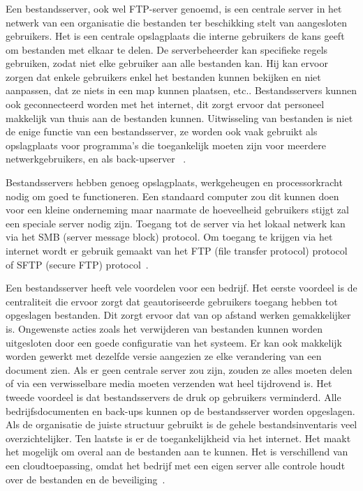 \subsubsection{}
\label{subsubsec:Bestandsserver}
Een bestandsserver, ook wel FTP-server genoemd, is een centrale server in het netwerk van een organisatie die bestanden ter beschikking stelt van aangesloten gebruikers. Het is een centrale opslagplaats die interne gebruikers de kans geeft om bestanden met elkaar te delen. De serverbeheerder kan specifieke regels gebruiken, zodat niet elke gebruiker aan alle bestanden kan. Hij kan ervoor zorgen dat enkele gebruikers enkel het bestanden kunnen bekijken en niet aanpassen, dat ze niets in een map kunnen plaatsen, etc.. Bestandsservers kunnen ook geconnecteerd worden met het internet, dit zorgt ervoor dat personeel makkelijk van thuis aan de bestanden kunnen. Uitwisseling van bestanden is niet de enige functie van een bestandsserver, ze worden ook vaak gebruikt als opslagplaats voor programma's die toegankelijk moeten zijn voor meerdere netwerkgebruikers, en als back-upserver  ~\autocite{Ionos2019}.

Bestandsservers hebben genoeg opslagplaats, werkgeheugen en processorkracht nodig om goed te functioneren. Een standaard computer zou dit kunnen doen voor een kleine onderneming maar naarmate de hoeveelheid gebruikers stijgt zal een speciale server nodig zijn. Toegang tot de server via het lokaal netwerk kan via het SMB (server message block) protocol. Om toegang te krijgen via het internet wordt er gebruik gemaakt van het FTP (file transfer protocol) protocol of SFTP (secure FTP) protocol~\autocite{Ionos2019}.

Een bestandsserver heeft vele voordelen voor een bedrijf. Het eerste voordeel is de centraliteit die ervoor zorgt dat geautoriseerde gebruikers toegang hebben tot opgeslagen bestanden. Dit zorgt ervoor dat van op afstand werken gemakkelijker is. Ongewenste acties zoals het verwijderen van bestanden kunnen worden uitgesloten door een goede configuratie van het systeem. Er kan ook makkelijk worden gewerkt met dezelfde versie aangezien ze elke verandering van een document zien. Als er geen centrale server zou zijn, zouden ze alles moeten delen of via een verwisselbare media moeten verzenden wat heel tijdrovend is. Het tweede voordeel is dat bestandsservers de druk op gebruikers verminderd. Alle bedrijfsdocumenten en back-ups kunnen op de bestandsserver worden opgeslagen. Als de organisatie de juiste structuur gebruikt is de gehele bestandsinventaris veel overzichtelijker. Ten laatste is er de toegankelijkheid via het internet. Het maakt het mogelijk om overal aan de bestanden aan te kunnen. Het is verschillend van een cloudtoepassing, omdat het bedrijf met een eigen server alle controle houdt over de bestanden en de beveiliging~\autocite{Ionos2019}.

